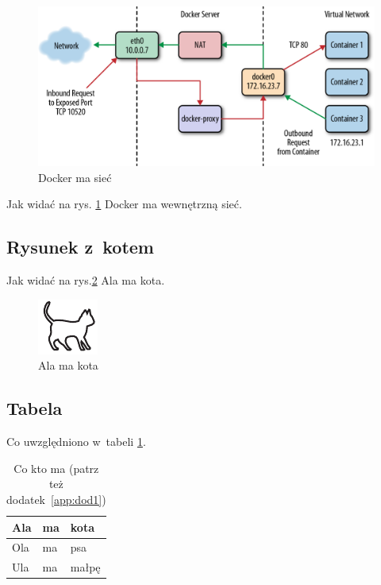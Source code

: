 \begin{figure}
    \centering\includegraphics[width=.6\textwidth]{demo/img/swarm-network}
    \caption{Docker ma sieć}  \label{rys:network}
    \raggedright{}
\end{figure}

Jak widać na rys. \ref{rys:network} Docker ma wewnętrzną sieć. \lipsum[1]


\subsection{Rysunek z~kotem}

Jak widać na rys.\ref{rysunek:kot} Ala ma kota. \lipsum[9-10]

\begin{figure}[H]
    \centering\includegraphics[width=.4\textwidth]{demo/img/kotek}
    \caption{Ala ma kota}\label{rysunek:kot}
    \raggedright\source{\ownwork}
\end{figure}

\subsection{Tabela}

Co uwzględniono w~tabeli \ref{tabela:coktoma}. \lipsum[13-15]

\begin{table}[h!]
    \raggedright\caption{Co kto ma (patrz też dodatek~\ref{app:dod1}) \label{tabela:coktoma}}
    \begin{center}\begin{tabular}{|l|l|l|}%
        \hline
        Ala & ma & kota \\
        \hline
        Ola & ma & psa \\
        \hline
        Ula & ma & małpę\\
        \hline
    \end{tabular}\end{center}


    \raggedright{}
\end{table}

